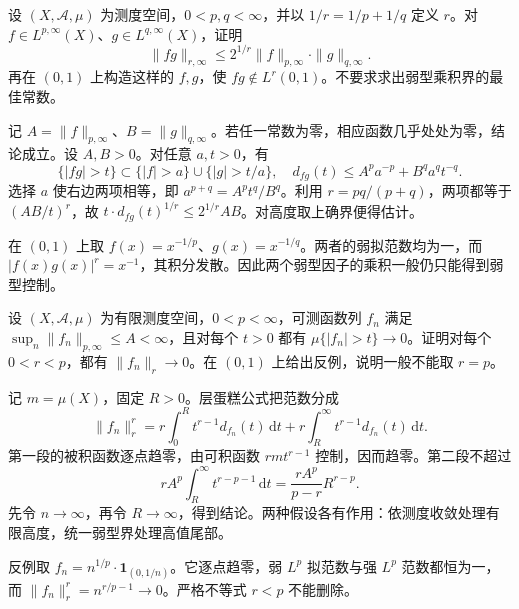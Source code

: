 \begin{exercise}\label{b2:ex:17-new-2}
设 \((X,\mathcal A,\mu)\) 为测度空间，\(0<p,q<\infty\)，并以 \(1/r=1/p+1/q\) 定义 \(r\)。对 \(f\in L^{p,\infty}(X)\)、\(g\in L^{q,\infty}(X)\)，证明
\[
 \|fg\|_{r,\infty}\leq 2^{1/r}\|f\|_{p,\infty}\cdot\|g\|_{q,\infty}.
\]
再在 \((0,1)\) 上构造这样的 \(f,g\)，使 \(fg\notin L^r(0,1)\)。不要求求出弱型乘积界的最佳常数。
\end{exercise}
\begin{solution}
记 \(A=\|f\|_{p,\infty}\)、\(B=\|g\|_{q,\infty}\)。若任一常数为零，相应函数几乎处处为零，结论成立。设 \(A,B>0\)。对任意 \(a,t>0\)，有
\[
 \{|fg|>t\}\subset\{|f|>a\}\cup\{|g|>t/a\},
 \quad d_{fg}(t)\leq A^pa^{-p}+B^qa^qt^{-q}.
\]
选择 \(a\) 使右边两项相等，即 \(a^{p+q}=A^pt^q/B^q\)。利用 \(r=pq/(p+q)\)，两项都等于 \((AB/t)^r\)，故 \(t\cdot d_{fg}(t)^{1/r}\leq2^{1/r}AB\)。对高度取上确界便得估计。

在 \((0,1)\) 上取 \(f(x)=x^{-1/p}\)、\(g(x)=x^{-1/q}\)。两者的弱拟范数均为一，而 \(|f(x)g(x)|^r=x^{-1}\)，其积分发散。因此两个弱型因子的乘积一般仍只能得到弱型控制。
\end{solution}

\begin{exercise}\label{b2:ex:17-new-3}
设 \((X,\mathcal A,\mu)\) 为有限测度空间，\(0<p<\infty\)，可测函数列 \(f_n\) 满足 \(\sup_n\|f_n\|_{p,\infty}\leq A<\infty\)，且对每个 \(t>0\) 都有 \(\mu\{|f_n|>t\}\to0\)。证明对每个 \(0<r<p\)，都有 \(\|f_n\|_r\to0\)。在 \((0,1)\) 上给出反例，说明一般不能取 \(r=p\)。
\end{exercise}
\begin{solution}
记 \(m=\mu(X)\)，固定 \(R>0\)。层蛋糕公式把范数分成
\[
 \|f_n\|_r^r
 =r\int_0^R t^{r-1}d_{f_n}(t)\,\mathrm dt
  +r\int_R^\infty t^{r-1}d_{f_n}(t)\,\mathrm dt.
\]
第一段的被积函数逐点趋零，由可积函数 \(rm t^{r-1}\) 控制，因而趋零。第二段不超过
\[
 rA^p\int_R^\infty t^{r-p-1}\,\mathrm dt
 =\frac{rA^p}{p-r}R^{r-p}.
\]
先令 \(n\to\infty\)，再令 \(R\to\infty\)，得到结论。两种假设各有作用：依测度收敛处理有限高度，统一弱型界处理高值尾部。

反例取 \(f_n=n^{1/p}\cdot\mathbf1_{(0,1/n)}\)。它逐点趋零，弱 \(L^p\) 拟范数与强 \(L^p\) 范数都恒为一，而 \(\|f_n\|_r^r=n^{r/p-1}\to0\)。严格不等式 \(r<p\) 不能删除。
\end{solution}

